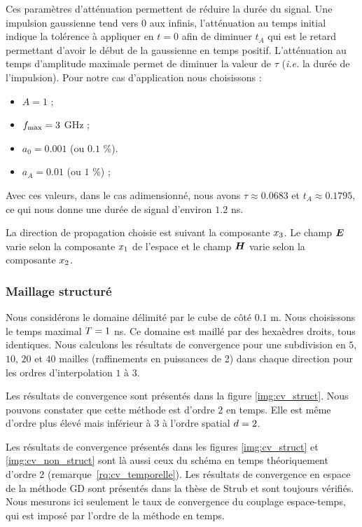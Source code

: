 Ces paramètres d'atténuation permettent de réduire la durée du signal.
Une impulsion gaussienne tend vers $0$ aux infinis, l'atténuation au temps
initial indique la tolérence à appliquer en $t=0$ afin de diminuer $t_A$ qui
est le retard permettant d'avoir le début de la gaussienne en temps positif.
L'atténuation au temps d'amplitude maximale permet de diminuer la valeur
de $\tau$ (\textit{i.e.} la durée de l'impulsion).
Pour notre cas d'application nous choisissons :
\begin{itemize}
	\item $A = 1$ ;
	\item $f_{\max} = 3$ GHz ;
	\item $a_0 = 0.001$ (ou $0.1$ \%).
	\item $a_A = 0.01$ (ou $1$ \%) ;
\end{itemize}
Avec ces valeurs, dans le cas adimensionné,
nous avons $\tau \approx 0.0683$ et $t_A \approx 0.1795$,
ce qui nous donne une durée de signal d'environ $1.2$ ns.

La direction de propagation choisie est suivant la composante $x_3$.
Le champ $\bm{E}$ varie selon la composante $x_1$ de l'espace et le champ
$\bm{H}$ varie selon la composante $x_2$.



\subsubsection{Maillage structuré}
\label{sssect:cv_gd_rk2_struct}


Nous considérons le domaine délimité par le cube de côté $0.1$ m.
Nous choisissons le temps maximal $T = 1$ ns.
Ce domaine est maillé par des hexaèdres droits, tous identiques.
Nous calculons les résultats de convergence pour une subdivision
en $5$, $10$, $20$ et $40$ mailles (raffinements en puissances de 2)
dans chaque direction pour les ordres d'interpolation $1$ à $3$.

Les résultats de convergence sont présentés dans la figure \ref{img:cv_struct}.
Nous pouvons constater que cette méthode est d'ordre $2$ en temps.
Elle est même d'ordre plus élevé mais inférieur à $3$ à l'ordre
spatial $d = 2$.

\begin{remark}
	Les résultats de convergence présentés dans les figures 
	\ref{img:cv_struct} et \ref{img:cv_non_struct}
	sont là aussi ceux du schéma en temps théoriquement d'ordre $2$
	(remarque~\ref{rq:cv_temporelle}).
	Les résultats de convergence en espace de la méthode GD sont présentés dans la thèse de Strub \cite{strub:tel-01651258} et sont toujours vérifiés. Nous mesurons ici seulement le taux de convergence 
	du couplage espace-temps, qui est imposé par l'ordre de la méthode en temps.
\end{remark}



